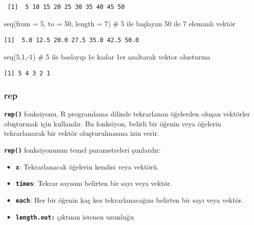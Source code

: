 \documentclass[
  letterpaper,
  DIV=11,
  numbers=noendperiod]{scrreprt}
\newenvironment{Shaded}{\begin{snugshade}}{\end{snugshade}}
\newcommand{\AttributeTok}[1]{\textcolor[rgb]{0.40,0.45,0.13}{#1}}
\newcommand{\CommentTok}[1]{\textcolor[rgb]{0.37,0.37,0.37}{#1}}
\newcommand{\DecValTok}[1]{\textcolor[rgb]{0.68,0.00,0.00}{#1}}
\newcommand{\FunctionTok}[1]{\textcolor[rgb]{0.28,0.35,0.67}{#1}}
\newcommand{\NormalTok}[1]{\textcolor[rgb]{0.00,0.23,0.31}{#1}}
\newcommand{\SpecialCharTok}[1]{\textcolor[rgb]{0.37,0.37,0.37}{#1}}
\begin{document}
\begin{verbatim}
 [1]  5 10 15 20 25 30 35 40 45 50
\end{verbatim}

\begin{Shaded}
\begin{Highlighting}[]
\FunctionTok{seq}\NormalTok{(}\AttributeTok{from =} \DecValTok{5}\NormalTok{, }\AttributeTok{to =} \DecValTok{50}\NormalTok{, }\AttributeTok{length =} \DecValTok{7}\NormalTok{) }\CommentTok{\# 5 ile başlayan 50 ile 7 elemanlı vektör}
\end{Highlighting}
\end{Shaded}

\begin{verbatim}
[1]  5.0 12.5 20.0 27.5 35.0 42.5 50.0
\end{verbatim}

\begin{Shaded}
\begin{Highlighting}[]
\FunctionTok{seq}\NormalTok{(}\DecValTok{5}\NormalTok{,}\DecValTok{1}\NormalTok{,}\SpecialCharTok{{-}}\DecValTok{1}\NormalTok{) }\CommentTok{\# 5 ile baslayıp 1\textquotesingle{}e kadar 1\textquotesingle{}er azaltarak vektor olusturma}
\end{Highlighting}
\end{Shaded}

\begin{verbatim}
[1] 5 4 3 2 1
\end{verbatim}

\subsubsection{\texorpdfstring{\textbf{rep}}{rep}}\label{rep}

\textbf{\texttt{rep()}} fonksiyonu, R programlama dilinde tekrarlanan
öğelerden oluşan vektörler oluşturmak için kullanılır. Bu fonksiyon,
belirli bir öğenin veya öğelerin tekrarlanarak bir vektör
oluşturulmasına izin verir.

\textbf{\texttt{rep()}} fonksiyonunun temel parametreleri şunlardır:

\begin{itemize}
\item
  \textbf{\texttt{x}}: Tekrarlanacak öğelerin kendisi veya vektörü.
\item
  \textbf{\texttt{times}}: Tekrar sayısını belirten bir sayı veya
  vektör.
\item
  \textbf{\texttt{each}}: Her bir öğenin kaç kez tekrarlanacağını
  belirten bir sayı veya vektör.
\item
  \textbf{\texttt{length.out:}} çıktının istenen uzunluğu
\end{itemize}
\end{document}
